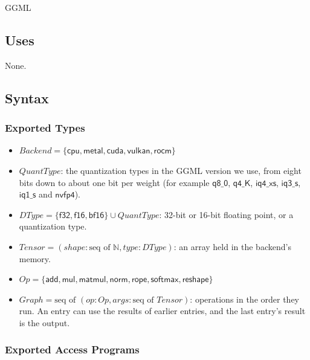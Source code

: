 \documentclass[12pt, titlepage]{article}
\begin{document}
GGML

\subsection{Uses}

None.

\subsection{Syntax}

\subsubsection{Exported Types}

\begin{itemize}
  \item $\mathit{Backend} = \{\mathsf{cpu}, \mathsf{metal}, \mathsf{cuda},
    \mathsf{vulkan}, \mathsf{rocm}\}$
  \item $\mathit{QuantType}$: the quantization types in the GGML version we
    use, from eight bits down to about one bit per weight (for example
    $\mathsf{q8\_0}$, $\mathsf{q4\_K}$, $\mathsf{iq4\_xs}$, $\mathsf{iq3\_s}$,
    $\mathsf{iq1\_s}$ and $\mathsf{nvfp4}$).
  \item $\mathit{DType} = \{\mathsf{f32}, \mathsf{f16}, \mathsf{bf16}\} \cup
    \mathit{QuantType}$: 32-bit or 16-bit floating point, or a quantization type.
  \item $\mathit{Tensor} = (\mathit{shape}: \text{seq of } \mathbb{N},
    \mathit{type}: \mathit{DType})$: an array held in the backend's memory.
  \item $\mathit{Op} = \{\mathsf{add}, \mathsf{mul}, \mathsf{matmul},
    \mathsf{norm}, \mathsf{rope}, \mathsf{softmax}, \mathsf{reshape}\}$
  \item $\mathit{Graph} = \text{seq of } (\mathit{op}: \mathit{Op},
    \mathit{args}: \text{seq of } \mathit{Tensor})$: operations in the order
    they run. An entry can use the results of earlier entries, and the last
    entry's result is the output.
\end{itemize}

\subsubsection{Exported Access Programs}
\end{document}
